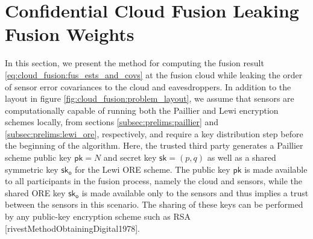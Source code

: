 % 
%                                                                               
%                                                                               
%                                                                               
% 

\section{Confidential Cloud Fusion Leaking Fusion Weights}\label{sec:cloud_fusion:fusion_with_leakage}
In this section, we present the method for computing the fusion result \eqref{eq:cloud_fusion:fus_ests_and_covs} at the fusion cloud while leaking the order of sensor error covariances to the cloud and eavesdroppers. In addition to the layout in figure \ref{fig:cloud_fusion:problem_layout}, we assume that sensors are computationally capable of running both the Paillier and Lewi encryption schemes locally, from sections \ref{subsec:prelims:paillier} and \ref{subsec:prelims:lewi_ore}, respectively, and require a key distribution step before the beginning of the algorithm. Here, the trusted third party generates a Paillier scheme public key $\mathsf{pk}=N$ and secret key $\mathsf{sk}=(p,q)$ as well as a shared symmetric key $\mathsf{sk}_{\mathsf{o}}$ for the Lewi ORE scheme. The public key $\mathsf{pk}$ is made available to all participants in the fusion process, namely the cloud and sensors, while the shared ORE key $\mathsf{sk}_{\mathsf{o}}$ is made available only to the sensors and thus implies a trust between the sensors in this scenario. The sharing of these keys can be performed by any public-key encryption scheme such as RSA [rivestMethodObtainingDigital1978].


